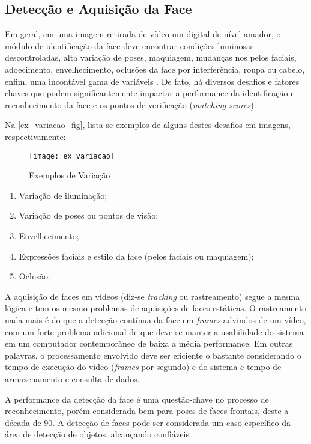 \subsection{Detecção e Aquisição da Face}\label{subsec:aquisicao_imagem}

Em geral, em uma imagem retirada de vídeo um digital de nível amador, o módulo de identificação da face deve encontrar condições luminosas descontroladas, alta variação de poses, maquiagem, mudanças nos pelos faciais, adoecimento, envelhecimento, oclusões da face por interferência, roupa ou cabelo, enfim, uma incontável gama de variáveis \cite{tony_columbia}. De fato, há diversos desafios e fatores chaves que podem significantemente impactar a performance da identificação e reconhecimento da face e os pontos de verificação (\textit{matching scores}).

Na \autoref{ex_variacao_fig}, lista-se exemplos de alguns destes desafios em imagens, respectivamente:

\begin{figure}[h]
	\centering
	\texttt{[image: ex\_variacao]}
	\caption{Exemplos de Variação}
	\label{ex_variacao_fig}
\end{figure}


\begin{enumerate}[label=(\alph*)]
	\item Variação de iluminação;
	\item Variação de poses ou pontos de visão;
	\item Envelhecimento;
	\item Expressões faciais e estilo da face (pelos faciais ou maquiagem);
	\item Oclusão.
\end{enumerate}


A aquisição de faces em vídeos (diz-se \textit{tracking} ou rastreamento) segue a mesma lógica e tem os mesmo problemas de aquisições de faces estáticas. O rastreamento nada mais é do que a detecção contínua da face em \textit{frames} advindos de um vídeo, com um forte problema adicional de que deve-se manter a usabilidade do sistema em um computador contemporâneo de baixa a média performance. Em outras palavras, o processamento envolvido deve ser eficiente o bastante considerando o tempo de execução do vídeo (\textit{frames} por segundo) e do sistema e tempo de armazenamento e consulta de dados.

A performance da detecção da face é uma questão-chave no processo de reconhecimento, porém considerada bem para poses de faces frontais, deste a década de 90. A detecção de faces pode ser considerada um caso específico da área de detecção de objetos, alcançando confiáveis \cite{stats_face_detection_IEEE}.

